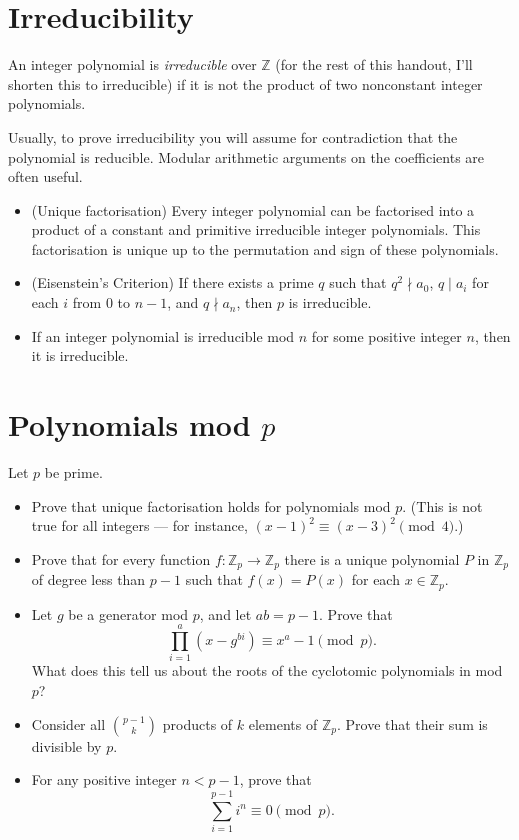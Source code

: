 \documentclass{article}
\newcommand\Zz{\mathbb{Z}}
\begin{document}
\section{Irreducibility}
An integer polynomial is \emph{irreducible} over $\mathbb Z$ (for the rest of
this handout, I'll shorten this to irreducible) if it is not the product of two
nonconstant integer polynomials.

Usually, to prove irreducibility you will assume for contradiction that the
polynomial is reducible. Modular arithmetic arguments on the coefficients are
often useful.
\begin{itemize}
  \item (Unique factorisation) Every integer polynomial can be factorised into a
    product of a constant and primitive irreducible integer
    polynomials. This factorisation is unique up to the permutation and sign of
    these polynomials.
  \item (Eisenstein's Criterion) If there exists a prime $q$ such that $q^2\nmid
    a_0$, $q\mid a_i$ for each $i$ from $0$ to $n-1$, and $q\nmid a_n$, then $p$
    is irreducible.
  \item If an integer polynomial is irreducible mod $n$ for some positive integer
      $n$, then it is irreducible.
\end{itemize}
\section{Polynomials mod $p$}
Let $p$ be prime.
\begin{itemize}
  \item Prove that unique factorisation holds for polynomials mod $p$. (This is
    not true for all integers --- for instance,
    $(x-1)^2\equiv(x-3)^2\pmod 4$.)
  \item Prove that for every function $f:\Zz_p\to\Zz_p$ there is a unique polynomial $P$ in
    $\Zz_p$ of degree less than $p-1$ such that $f(x)=P(x)$ for each
    $x\in\Zz_p$.
  \item Let $g$ be a generator mod $p$, and let $ab=p-1$. Prove that
    \[\prod_{i=1}^a (x-g^{bi})\equiv x^a-1\pmod p.\]
    What does this tell us about the roots of the cyclotomic polynomials in mod
    $p$?
  \item Consider all $\binom{p-1}k$ products of $k$ elements of $\Zz_p$. Prove
    that their sum is divisible by $p$.
  \item For any positive integer $n<p-1$, prove that
    \[\sum_{i=1}^{p-1} i^n\equiv 0\pmod p.\]
\end{itemize}
\end{document}
